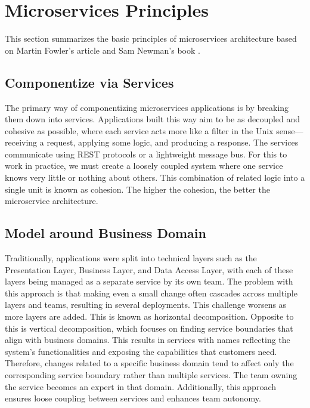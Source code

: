 \section{Microservices Principles}
This section summarizes the basic principles of microservices architecture based on Martin Fowler's article \cite{Fowler} and Sam Newman's book \cite{NewmanBuildingMicroservices}.

\subsection{Componentize via Services}
The primary way of componentizing microservices applications is by breaking them down into services. Applications built this way aim to be as decoupled and cohesive as possible, where each service acts more like a filter in the Unix sense—receiving a request, applying some logic, and producing a response. The services communicate using REST protocols or a lightweight message bus. For this to work in practice, we must create a loosely coupled system where one service knows very little or nothing about others. This combination of related logic into a single unit is known as cohesion. The higher the cohesion, the better the microservice architecture.

\subsection{Model around Business Domain}
Traditionally, applications were split into technical layers such as the Presentation Layer, Business Layer, and Data Access Layer, with each of these layers being managed as a separate service by its own team. The problem with this approach is that making even a small change often cascades across multiple layers and teams, resulting in several deployments. This challenge worsens as more layers are added. This is known as horizontal decomposition. Opposite to this is vertical decomposition, which focuses on finding service boundaries that align with business domains. This results in services with names reflecting the system’s functionalities and exposing the capabilities that customers need. Therefore, changes related to a specific business domain tend to affect only the corresponding service boundary rather than multiple services. The team owning the service becomes an expert in that domain. Additionally, this approach ensures loose coupling between services and enhances team autonomy.

